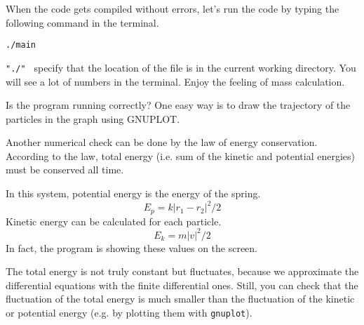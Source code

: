 \documentclass[a4,10pt]{article}
\begin{document}
When the code gets compiled without errors, let's run the code by
typing the following command in the terminal.
\begin{screen}
\begin{verbatim}
./main
\end{verbatim}
\end{screen}
{\tt "./" } specify that the location of the file is in the current
working directory.  You will see a lot of numbers in the terminal.
Enjoy the feeling of mass calculation.

Is the program running correctly?  One easy way is to draw the
trajectory of the particles in the graph using GNUPLOT.

Another numerical check can be done by the law of energy
conservation.  According to the law, total energy (i.e. sum of the
kinetic and potential energies) must be conserved all time.

In this system, potential energy is the energy of the spring.
\begin{equation}\label{eq:e_sp}
E_p = k \left| r_1 - r_2 \right|^2 / 2
\end{equation}
Kinetic energy can be calculated for each particle.
\begin{equation}
E_k = m \left| v \right|^2 / 2
\end{equation}
In fact, the program is showing these values on the screen.

The total energy is not truly constant but fluctuates, because we
approximate the differential equations with the finite differential
ones.
Still, you can check that the fluctuation of the total energy is much
smaller than the fluctuation of the kinetic or potential energy
(e.g. by plotting them with {\tt gnuplot}).
\end{document}
